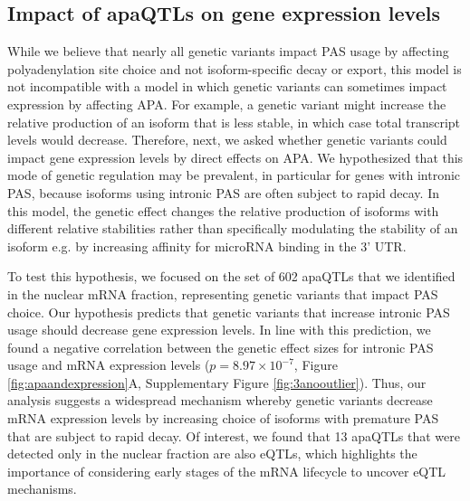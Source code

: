 \begin{figure}[!htb]
 \end{figure}
 
 
 

\subsection{Impact of apaQTLs on gene expression levels}\label{apa-QTLs-expression}


While we believe that nearly all genetic variants impact PAS usage by affecting polyadenylation site choice and not isoform-specific decay or export, this model is not incompatible with a model in which genetic variants can sometimes impact expression by affecting APA. For example, a genetic variant might increase the relative production of an isoform that is less stable, in which case total transcript levels would decrease. Therefore, next, we asked whether genetic variants could impact gene expression levels by direct effects on APA. We hypothesized that this mode of genetic regulation may be prevalent, in particular for genes with intronic PAS, because isoforms using intronic PAS are often subject to rapid decay. In this model, the genetic effect changes the relative production of isoforms with different relative stabilities rather than specifically modulating the stability of an isoform e.g. by increasing affinity for microRNA binding in the 3' UTR.

To test this hypothesis, we focused on the set of 602 apaQTLs that we identified in the nuclear mRNA fraction, representing genetic variants that impact PAS choice. Our hypothesis predicts that genetic variants that increase intronic PAS usage should decrease gene expression levels. In line with this prediction, we found a negative correlation between the genetic effect sizes for intronic PAS usage and mRNA expression levels ($p = 8.97 \times 10^{-7}$, Figure \ref{fig:apaandexpression}A, Supplementary Figure \ref{fig:3anooutlier}). Thus, our analysis suggests a widespread mechanism whereby genetic variants decrease mRNA expression levels by increasing choice of isoforms with premature PAS that are subject to rapid decay. Of interest, we found that 13 apaQTLs that were detected only in the nuclear fraction are also eQTLs, which highlights the importance of considering early stages of the mRNA lifecycle to uncover eQTL mechanisms.

